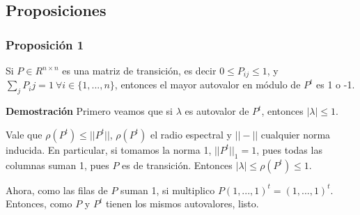 \subsection{Proposiciones}

\subsubsection{Proposición 1}
\label{subsub:prop1}
Si $P \in R^{n\times n}$ es una matriz de transición, es decir $0 \leq P_{ij} \leq 1$, y $\sum_j P_ij = 1 \ \forall i\in\{1,...,n\}$, entonces el mayor autovalor en módulo de $P^t$ es 1 o -1.

\textbf{Demostración} Primero veamos que si $\lambda$ es autovalor de $P^t$, entonces $|\lambda| \leq 1$.

Vale que $\rho(P^t) \leq ||P^t||$, $\rho(P^t)$ el radio espectral y $||-||$ cualquier norma inducida. En particular, si tomamos la norma 1, $||P^t||_1 = 1$, pues todas las columnas suman 1, pues $P$ es de transición. Entonces $|\lambda| \leq \rho(P^t) \leq 1$.

Ahora, como las filas de $P$ suman 1, si multiplico $P (1, ..., 1)^t = (1, ..., 1)^t$. Entonces, como $P$ y $P^t$ tienen los mismos autovalores, listo.



\newpage
\nocite{*}
\printbibliography


